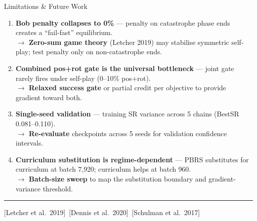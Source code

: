 \documentclass[aspectratio=169,xcolor=dvipsnames,t]{beamer}
\newcommand{\litfooter}[1]{%
  \vspace{2pt}%
  \hrule%
  \vspace{2pt}%
  {\tiny\color{LightDarkGrey} #1}%
}
\begin{document}


\begin{frame}[t]{Limitations \& Future Work}
  \small
  \begin{enumerate}
    \item \textbf{Bob penalty collapses to 0\%} — penalty on catastrophe phase ends creates a ``fail-fast'' equilibrium.\\
    $\rightarrow$ \textbf{Zero-sum game theory} (Letcher 2019) may stabilise symmetric self-play; test penalty only on non-catastrophe ends.

    \item \textbf{Combined pos+rot gate is the universal bottleneck} — joint gate rarely fires under self-play (0--10\% pos+rot).\\
    $\rightarrow$ \textbf{Relaxed success gate} or partial credit per objective to provide gradient toward both.

    \item \textbf{Single-seed validation} — training SR variance across 5 chains (BestSR 0.081--0.110).\\
    $\rightarrow$ \textbf{Re-evaluate} checkpoints across 5 seeds for validation confidence intervals.

    \item \textbf{Curriculum substitution is regime-dependent} — PBRS substitutes for curriculum at batch 7{,}920; curriculum helps at batch 960.\\
    $\rightarrow$ \textbf{Batch-size sweep} to map the substitution boundary and gradient-variance threshold.
  \end{enumerate}

  \vfill\litfooter{[Letcher et al.\ 2019]~[Dennis et al.\ 2020]~[Schulman et al.\ 2017]}
\end{frame}
\end{document}
